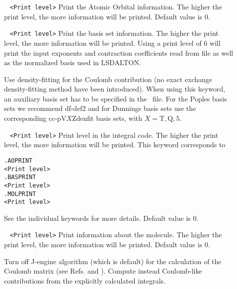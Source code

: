 \begin{description}
\item[] 
\verb| | \newline
\verb|<Print level>|\newline
Print the Atomic Orbital information. The higher the print level, the more information will be printed. Default value is 0.
\item[] 
\verb| | \newline
\verb|<Print level>|\newline
Print the basis set information. The higher the print level, the more information will be printed.
Using a print level of 6 will print the input exponents and contraction coefficients read from file as well as the normalized basis used in LSDALTON.  
\item[] Use density-fitting for the Coulomb contribution (no exact exchange density-fitting method have been introduced). 
When using this keyword, an auxiliary basis set has to be 
specified in the \mol\ file. For the Poples basis sets we recommend df-def2 and for
Dunnings basis sets use the corresponding cc-pV$X$Zdenfit basis sets, with $X=$T$,$Q$,5$.
\item[] 
\verb| | \newline
\verb|<Print level>|\newline
Print level in the integral code. The higher the print level, the more information will be printed. This keyword corresponds to 
\begin{verbatim}
.AOPRINT
<Print level>
.BASPRINT
<Print level>
.MOLPRINT
<Print level>
\end{verbatim} 
See the individual keywords for more details. Default value is 0.
\item[] 
\verb| | \newline
\verb|<Print level>|\newline
Print information about the molecule. The higher the print level, the more information will be printed. Default value is 0.
\item[] Turn off J-engine algorithm (which is default) for the calculation of the Coulomb matrix 
(see Refs. \cite{shao:425} and \cite{shao:6572}). Compute instead Coulomb-like contributions from the explicitly calculated integrals.

\end{description}
